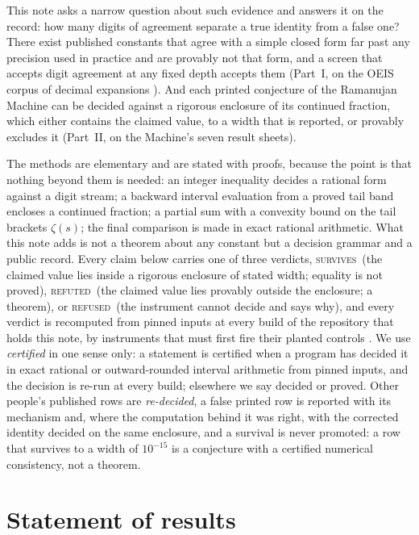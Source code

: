 \documentclass[11pt]{article}
\theoremstyle{definition}
\theoremstyle{plain}
\newcommand{\vS}{\textsc{survives}}
\newcommand{\vR}{\textsc{refuted}}
\newcommand{\vF}{\textsc{refused}}
\begin{document}
This note asks a narrow question about such evidence and answers it on the record: how many digits of agreement separate a true identity from a false one? There exist published constants that agree with a simple closed form far past any precision used in practice and are provably not that form, and a screen that accepts digit agreement at any fixed depth accepts them (Part~I, on the OEIS corpus of decimal expansions \cite{OEIS}). And each printed conjecture of the Ramanujan Machine can be decided against a rigorous enclosure of its continued fraction, which either contains the claimed value, to a width that is reported, or provably excludes it (Part~II, on the Machine's seven result sheets).

The methods are elementary and are stated with proofs, because the point is that nothing beyond them is needed: an integer inequality decides a rational form against a digit stream; a backward interval evaluation from a proved tail band encloses a continued fraction; a partial sum with a convexity bound on the tail brackets $\zeta(s)$; the final comparison is made in exact rational arithmetic. What this note adds is not a theorem about any constant but a decision grammar and a public record. Every claim below carries one of three verdicts, \vS\ (the claimed value lies inside a rigorous enclosure of stated width; equality is not proved), \vR\ (the claimed value lies provably outside the enclosure; a theorem), or \vF\ (the instrument cannot decide and says why), and every verdict is recomputed from pinned inputs at every build of the repository that holds this note, by instruments that must first fire their planted controls \cite{repo}. We use \emph{certified} in one sense only: a statement is certified when a program has decided it in exact rational or outward-rounded interval arithmetic from pinned inputs, and the decision is re-run at every build; elsewhere we say decided or proved. Other people's published rows are \emph{re-decided}, a false printed row is reported with its mechanism and, where the computation behind it was right, with the corrected identity decided on the same enclosure, and a survival is never promoted: a row that survives to a width of $10^{-15}$ is a conjecture with a certified numerical consistency, not a theorem.

\section{Statement of results}
\end{document}
